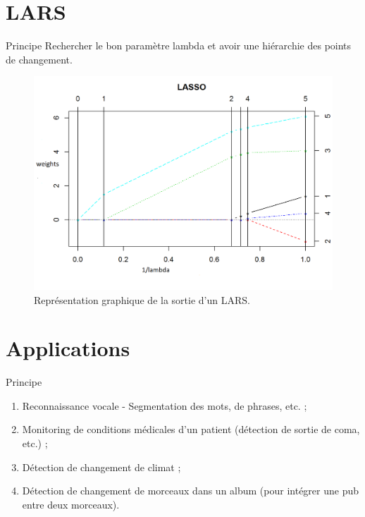 \documentclass{beamer}
\theoremstyle{definition}
\begin{document}
\section{LARS}
\begin{frame}[allowframebreaks]{\insertsection}
	\begin{block}{Principe}
		Rechercher le bon paramètre lambda et avoir une hiérarchie des points de changement.
	\end{block}
	
	\begin{figure}
		\includegraphics[scale=0.35]{lars.png}
		\caption{Représentation graphique de la sortie d'un LARS.}
		\label{fig:lars}
	\end{figure}
\end{frame}

\section{Applications}
\begin{frame}[allowframebreaks]{\insertsection}
	\begin{block}{Principe}
		\begin{enumerate}
			\item Reconnaissance vocale - Segmentation des mots, de phrases, etc. ;
			\item Monitoring de conditions médicales d'un patient (détection de sortie de coma, etc.) ;
			\item Détection de changement de climat ;
			\item Détection de changement de morceaux dans un album (pour intégrer une pub entre deux morceaux).
		\end{enumerate}
	\end{block}
	
\end{frame}
\end{document}
